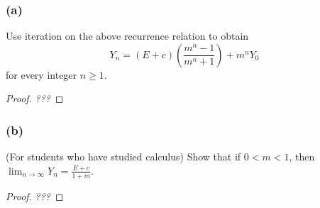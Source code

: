 \documentclass[14pt]{extarticle}
\newcommand{\dps}{\displaystyle}
\begin{document}
\subsubsection{(a)}
Use iteration on the above recurrence relation to obtain
\[
Y_n = (E + c)\left(\frac{m^n - 1}{m^n + 1}\right) + m^n Y_0
\]
for every integer \(n \geq 1\).

\begin{proof}
{\it ???}
\end{proof}

\subsubsection{(b)}
(For students who have studied calculus) Show that if \(0 < m < 1\), then \(\dps \lim_{n \to \infty} Y_n = \frac{E + c}{1 + m}\).

\begin{proof}
{\it ???}
\end{proof}
\end{document}
